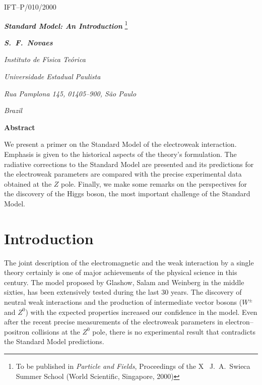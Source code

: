\documentclass[12pt]{report}
\newcommand{\slb}[1]{\textbf{\textsl{#1}}}
\begin{document}
\thispagestyle{empty}

\hfill IFT--P/010/2000

\vskip 1.5cm    
\begin{center}
{\LARGE \slb{Standard Model: An Introduction}}
\footnote{To be published in {\it Particle and Fields}, Proceedings of the X
~J.\ A.\ Swieca Summer School (World Scientific, Singapore, 2000)}

\vskip 1.5cm
{\large\slb{S.\ F.\ Novaes}}

\vskip 0.8cm
\textsl{Instituto de F\'{\i}sica Te\'orica}

\textsl{Universidade  Estadual Paulista}

\textsl{Rua Pamplona 145, 01405--900, S\~ao Paulo}

\textsl{Brazil}
\end{center}
\vspace{2cm}

\begin{minipage}[h]{5in}
\centerline{\large\bf Abstract}

\vspace{1.2cm}

\hskip 1cm 
We present a primer on the Standard Model of the electroweak
interaction. Emphasis is given to the historical aspects of the
theory's formulation.  The radiative corrections to the Standard
Model are presented and its predictions for the electroweak
parameters are compared with the precise experimental data obtained
at the $Z$ pole. Finally, we make some remarks on the perspectives
for the discovery of the Higgs boson, the most important challenge of
the Standard Model. 
\end{minipage}


\tableofcontents

\newpage
\chapter{Introduction} \indent

The joint description of the electromagnetic and the weak
interaction  by a single theory certainly is one of major
achievements of the physical science in this century. The model
proposed by Glashow, Salam and Weinberg in the middle sixties, has
been extensively tested during the last 30 years. The discovery of
neutral weak interactions and the production of intermediate vector
bosons ($W^\pm$ and $Z^0$) with the expected properties increased
our confidence in the model. Even after the recent precise
measurements of the electroweak parameters in electron--positron
collisions at the $Z^0$ pole, there is no experimental result that
contradicts the Standard Model predictions. 
\end{document}
